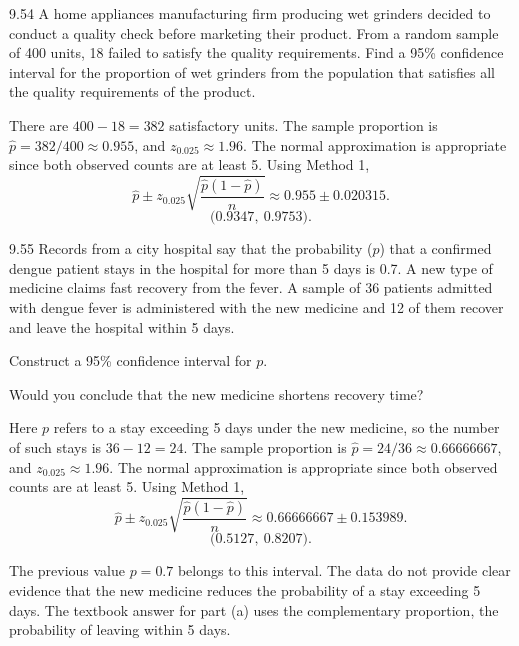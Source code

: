 \documentclass[11pt,oneside]{article}
\begin{document}
\begin{exercise}{9.54}
A home appliances manufacturing firm producing wet grinders decided to conduct a quality check before marketing their product. From a random sample of 400 units, 18 failed to satisfy the quality requirements. Find a 95\% confidence interval for the proportion of wet grinders from the population that satisfies all the quality requirements of the product.
\end{exercise}
\begin{solution}
There are $400-18=382$ satisfactory units. The sample proportion is $\hat p=382/400\approx0.955$, and $z_{0.025}\approx1.96$. The normal approximation is appropriate since both observed counts are at least 5. Using Method 1,
\[
\hat p\pm z_{0.025}\sqrt{\frac{\hat p(1-\hat p)}{n}}\approx0.955\pm 0.020315.
\]
\[
\boxed{\bigl(0.9347,\ 0.9753\bigr)}.
\]
\end{solution}

\begin{exercise}{9.55}
Records from a city hospital say that the probability ($p$) that a confirmed dengue patient stays in the hospital for more than 5 days is 0.7. A new type of medicine claims fast recovery from the fever. A sample of 36 patients admitted with dengue fever is administered with the new medicine and 12 of them recover and leave the hospital within 5 days.
\begin{exercisesubparts}
\item Construct a 95\% confidence interval for $p$.
\item Would you conclude that the new medicine shortens recovery time?
\end{exercisesubparts}
\end{exercise}
\begin{solution}
\begin{exercisesubparts}
\item Here $p$ refers to a stay exceeding 5 days under the new medicine, so the number of such stays is $36-12=24$. The sample proportion is $\hat p=24/36\approx0.66666667$, and $z_{0.025}\approx1.96$. The normal approximation is appropriate since both observed counts are at least 5. Using Method 1,
\[
\hat p\pm z_{0.025}\sqrt{\frac{\hat p(1-\hat p)}{n}}\approx0.66666667\pm 0.153989.
\]
\[
\boxed{\bigl(0.5127,\ 0.8207\bigr)}.
\]

\item The previous value $p=0.7$ belongs to this interval. The data do not provide clear evidence that the new medicine reduces the probability of a stay exceeding 5 days. The textbook answer for part (a) uses the complementary proportion, the probability of leaving within 5 days.
\end{exercisesubparts}
\end{solution}
\end{document}
